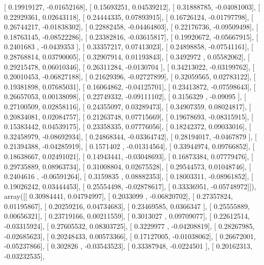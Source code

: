 \documentclass{article}
\begin{document}
       [ 0.19919127, -0.01652168],
       [ 0.15693251,  0.04539212],
       [ 0.31888785, -0.04081003],
       [ 0.22929361,  0.02643118],
       [ 0.24444335,  0.07893915],
       [ 0.16726124, -0.01797798],
       [ 0.26744217, -0.01838302],
       [ 0.22882458, -0.04464803],
       [ 0.22176736, -0.09509498],
       [ 0.18763145, -0.08522286],
       [ 0.23382816, -0.03615817],
       [ 0.19920672, -0.05667915],
       [ 0.2401683 , -0.0439353 ],
       [ 0.33357217,  0.07413023],
       [ 0.24898858, -0.07541161],
       [ 0.28768814,  0.03790005],
       [ 0.32907914,  0.01193843],
       [ 0.3492972 ,  0.05582062],
       [ 0.29215478,  0.06010346],
       [ 0.26311284, -0.0130704 ],
       [ 0.34213022, -0.03199762],
       [ 0.20010453, -0.06827188],
       [ 0.21629396, -0.02727899],
       [ 0.32059565,  0.02783122],
       [ 0.19381898,  0.07685031],
       [ 0.16064862, -0.04125701],
       [ 0.23413872, -0.07598643],
       [ 0.26657053,  0.00138098],
       [ 0.22749332, -0.09111102],
       [ 0.3156329 , -0.09095   ],
       [ 0.27100509,  0.02858116],
       [ 0.24355097,  0.03289473],
       [ 0.34907359,  0.08024817],
       [ 0.20834081,  0.02084757],
       [ 0.21263748,  0.07715669],
       [ 0.19678693, -0.08315915],
       [ 0.15383442,  0.04539175],
       [ 0.23358335,  0.07776056],
       [ 0.18242372,  0.09033016],
       [ 0.32458979, -0.08692934],
       [ 0.24868344, -0.03364742],
       [ 0.28194017, -0.0467879 ],
       [ 0.21394388, -0.04285919],
       [ 0.1571402 , -0.01314564],
       [ 0.33944974,  0.09766852],
       [ 0.18638667,  0.02491021],
       [ 0.14943441, -0.03048693],
       [ 0.16873384,  0.07779476],
       [ 0.29735889,  0.08963734],
       [ 0.31008804,  0.02675528],
       [ 0.29544573,  0.01048746],
       [ 0.2404616 , -0.06591264],
       [ 0.3159835 ,  0.08882353],
       [ 0.18003311, -0.08961852],
       [ 0.19026242,  0.03444453],
       [ 0.25554498, -0.02878617],
       [ 0.33336951, -0.05748972]]), array([[ 0.30984441,  0.04794997],
       [ 0.2033099 , -0.06820702],
       [ 0.27357824,  0.01195867],
       [ 0.20259216,  0.04734683],
       [ 0.23469585,  0.0366347 ],
       [ 0.25555889,  0.00656321],
       [ 0.23719166,  0.00211559],
       [ 0.3013027 ,  0.09709077],
       [ 0.22612514, -0.03315924],
       [ 0.27605532,  0.08303725],
       [ 0.3229977 , -0.04208819],
       [ 0.28267985, -0.02685623],
       [ 0.20248433,  0.00573366],
       [ 0.17127005, -0.01038062],
       [ 0.26672001, -0.05237866],
       [ 0.302826  , -0.03543523],
       [ 0.33387948, -0.0224501 ],
       [ 0.20162313, -0.03232535],
\end{document}
